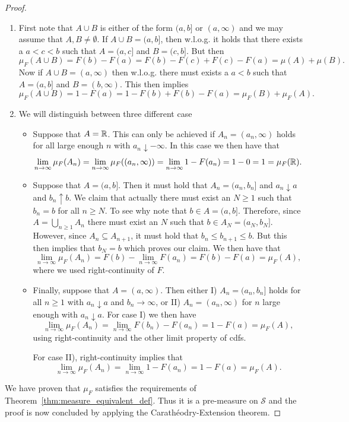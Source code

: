 \begin{proof}
\begin{enumerate}
\item First note that $A \cup B$ is either of the form $(a,b]$ or $(a,\infty)$ and we may assume that $A,B \ne \emptyset$. If $A \cup B = (a,b]$, then w.l.o.g. it holds that there exists a $a < c < b$ such that $A = (a,c]$ and $B = (c, b]$. But then
\[
	\mu_F(A \cup B) = F(b) - F(a) = F(b) - F(c) + F(c) - F(a) = \mu(A) + \mu(B). 
\]
Now if $A \cup B = (a, \infty)$ then w.l.o.g. there must exists a $a < b$ such that $A = (a,b]$ and $B = (b, \infty)$. This then implies
\[
	\mu_F(A \cup B) = 1 - F(a) = 1 - F(b) + F(b) - F(a) = \mu_F(B) + \mu_F(A).
\]
\item We will distinguish between three different case
\begin{itemize}
\item Suppose that $A = \mathbb R$. This can only be achieved if $A_n = (a_n, \infty)$ holds for all large enough $n$ with $a_n \downarrow -\infty$. In this case we then have that
\[
	\lim_{n \to \infty} \mu_F(A_n) = \lim_{n \to \infty} \mu_F((a_n, \infty)) = \lim_{n \to \infty} 1 - F(a_n)
	= 1 - 0 = 1 = \mu_F(\mathbb R).
\]
\item Suppose that $A = (a,b]$. Then it must hold that $A_n = (a_n, b_n]$ and $a_n \downarrow a$ and $b_n \uparrow b$. We claim that actually there must exist an $N \ge 1$ such that $b_n = b$ for all $n \ge N$. To see why note that $b \in A = (a,b]$. Therefore, since $A = \bigcup_{n \ge 1} A_n$ there must exist an $N$ such that $b \in A_N = (a_N, b_N]$. However, since $A_n \subseteq A_{n +1}$, it must hold that $b_n \le b_{n+1} \le b$. But this then implies that $b_N = b$ which proves our claim. We then have that
\[
	\lim_{n \to \infty} \mu_F(A_n) = F(b) - \lim_{n \to \infty} F(a_n) = F(b) - F(a) = \mu_F(A),
\]
where we used right-continuity of $F$.
\item Finally, suppose that $A = (a, \infty)$. Then either I) $A_n = (a_n, b_n]$ holds for all $n \ge 1$ with $a_n \downarrow a$ and $b_n \to \infty$, or II) $A_n = (a_n, \infty)$ for $n$ large enough with $a_n \downarrow a$. For case I) we then have
\[
	\lim_{n \to \infty} \mu_F(A_n) = \lim_{n \to \infty} F(b_n) - F(a_n) = 1 - F(a) = \mu_F(A), 
\]
using right-continuity and the other limit property of cdfs. 

For case II), right-continuity implies that
\[
	\lim_{n \to \infty} \mu_F(A_n) = \lim_{n \to \infty} 1 - F(a_n) = 1 - F(a) = \mu_F(A).
\]
\end{itemize}
\end{enumerate}

We have proven that $\mu_F$ satisfies the requirements of Theorem~\ref{thm:measure_equivalent_def}. Thus it is a pre-measure on $\mathcal{S}$ and the proof is now concluded by applying the Carath\'{e}odry-Extension theorem.

\end{proof}


